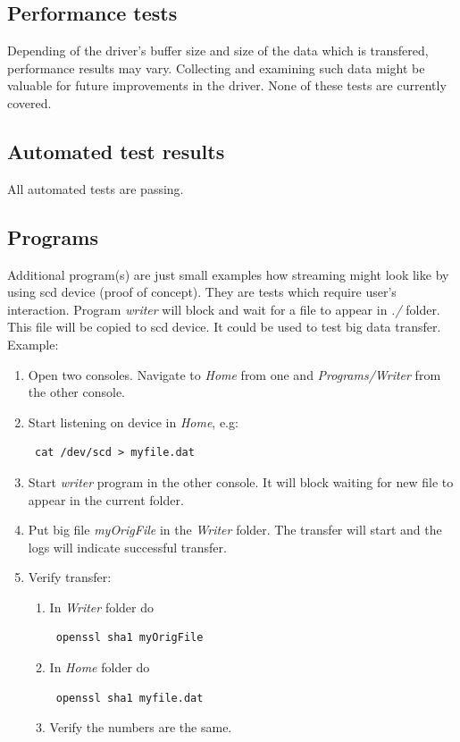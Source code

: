 \documentclass[11pt]{report}
\begin{document}
\subsection {Performance tests}
Depending of the driver's buffer size and size of the data which is transfered, performance results may vary. Collecting and examining such data might be valuable for future improvements in the driver. None of these tests are currently covered.  

\subsection {Automated test results}
All automated tests are passing.

\subsection{Programs}
Additional program(s) are just small examples how streaming might look like by using scd device (proof of concept). They are tests which require user's interaction. Program \emph{writer} will block and wait for a file to appear in \emph{./} folder. This file will be copied to scd device. It could be used to test big data transfer.
Example:
\begin{enumerate}
\item Open two consoles. Navigate to \emph{Home} from one and \emph{Programs/Writer} from the other console.
\item Start listening on device in \emph{Home}, e.g: \begin{verbatim} cat /dev/scd > myfile.dat \end{verbatim}
\item Start \emph{writer} program in the other console. It will block waiting for new file to appear in the current folder.
\item Put big file \emph{myOrigFile} in the \emph{Writer} folder. The transfer will start and the logs will indicate successful transfer.
\item Verify transfer:
\begin{enumerate}
\item In \emph{Writer} folder do \begin{verbatim} openssl sha1 myOrigFile \end{verbatim}
\item In \emph{Home} folder do \begin{verbatim} openssl sha1 myfile.dat \end{verbatim}
\item Verify the numbers are the same.
\end{enumerate}
\end{enumerate}
\end{document}
